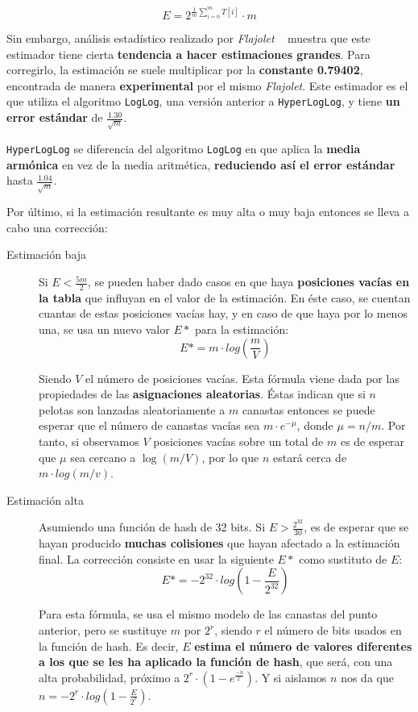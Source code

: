 $$ E = 2 ^ { \frac{1}{m} \sum\limits_{i=0}^{m}\! T[i] } \cdot m $$

Sin embargo, análisis estadístico realizado por \emph{Flajolet} ~\cite{hll:HyperLogLog} muestra que este estimador
tiene cierta \textbf{tendencia a hacer estimaciones grandes}. Para corregirlo, la estimación se suele multiplicar por la
\textbf{constante 0.79402}, encontrada de manera \textbf{experimental} por el mismo \emph{Flajolet}.
Este estimador es el que utiliza el algoritmo \texttt{LogLog}, una versión anterior a \texttt{HyperLogLog}, y tiene
\textbf{un error estándar} de  $\frac{1.30}{\sqrt{m}}$.

\texttt{HyperLogLog} se diferencia del algoritmo \texttt{LogLog} en que aplica la \textbf{media armónica} en vez de la
media aritmética, \textbf{reduciendo así el error estándar} hasta $\frac{1.04}{\sqrt{m}}$.

Por último, si la estimación resultante es muy alta o muy baja entonces se lleva a cabo una corrección:

\begin{description}
\item[Estimación baja] Si $E < \frac{5m}{2}$, se pueden haber dado casos en que haya \textbf{posiciones vacías en la tabla} que
influyan en el valor de la estimación. En éste caso, se cuentan cuantas de estas posiciones vacías
hay, y en caso de que haya por lo menos una, se usa un nuevo valor $E*$ para la estimación: 
$$E* = m \cdot log\left(\frac{m}{V}\right)$$

Siendo $V$ el número de posiciones vacías. Esta fórmula viene dada por las propiedades de las
\textbf{asignaciones aleatorias}. Éstas indican que si $n$ pelotas son lanzadas aleatoriamente a $m$ canastas entonces
se puede esperar que el número de canastas vacías sea $m \cdot e^{-\mu}$, donde $\mu = n / m$. Por tanto, si observamos
$V$ posiciones vacías sobre un total de $m$ es de esperar que $\mu$ sea cercano a $\log(m/V)$, por lo que $n$ estará
cerca de $m \cdot log(m/v)$.

\item[Estimación alta] Asumiendo una función de hash de 32 bits. Si $E > \frac{2^{32}}{30}$, es de esperar que se hayan
producido \textbf{muchas colisiones} que hayan afectado a la estimación final. La corrección consiste en usar la siguiente $E*$
como sustituto de $E$:
$$E* = -2^{32} \cdot log\left(1 - \frac{E}{2^{32}}\right)$$

Para esta fórmula, se usa el mismo modelo de las canastas del punto anterior, pero se sustituye $m$
por $2^r$, siendo $r$ el número de bits usados en la función de hash. Es decir, $E$ \textbf{estima el número de valores diferentes
a los que se les ha aplicado la función de hash}, que será, con una alta probabilidad, próximo a $2^r \cdot (1 - e^{\frac{-n}{2^r}})$.
Y si aislamos $n$ nos da que $n=-2^r \cdot log\left(1 - \frac{E}{2^r}\right)$.
\end{description}

